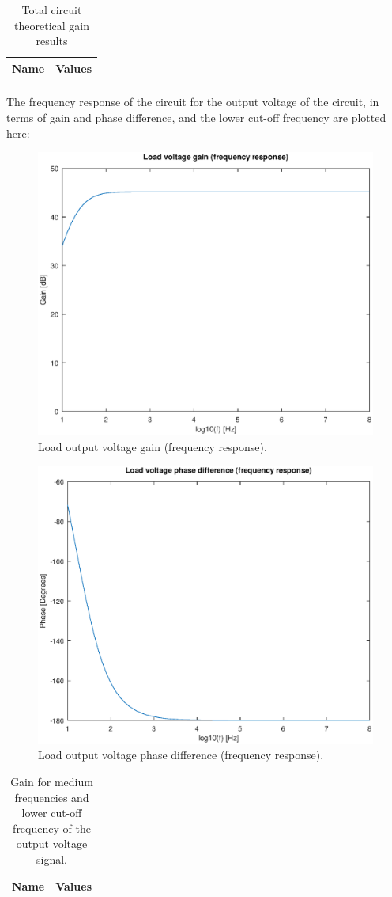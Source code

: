 \begin{table}[h]
  \centering
  \begin{tabular}{|l|r|}
    \hline    
    {\bf Name} & {\bf Values} \\ \hline
     
  \end{tabular}
  \caption{Total circuit theoretical gain results}
  \label{tab:output}
\end{table}

\paragraph{} The frequency response of the circuit for the output voltage of the circuit, in terms of gain and phase difference, and the lower cut-off frequency are plotted here:

\begin{figure}[!h] \centering
\includegraphics[width=0.6\linewidth]{Gain.eps}
\caption{Load output voltage gain (frequency response).}
\label{fig:gainfreq}
\end{figure}

\begin{figure}[!h] \centering
\includegraphics[width=0.6\linewidth]{Phase.eps}
\caption{Load output voltage phase difference (frequency response).}
\label{fig:phasefreq}
\end{figure}

\begin{table}[h]
  \centering
  \begin{tabular}{|l|r|}
    \hline    
    {\bf Name} & {\bf Values} \\ \hline
     
  \end{tabular}
  \caption{Gain for medium frequencies and lower cut-off frequency of the output voltage signal.}
  \label{tab:freq}
\end{table}

\clearpage
